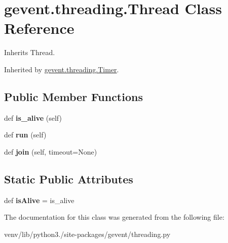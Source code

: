 \hypertarget{classgevent_1_1threading_1_1_thread}{}\section{gevent.\+threading.\+Thread Class Reference}
\label{classgevent_1_1threading_1_1_thread}


Inherits Thread.



Inherited by \hyperlink{classgevent_1_1threading_1_1_timer}{gevent.\+threading.\+Timer}.

\subsection*{Public Member Functions}
\begin{DoxyCompactItemize}
\item 
\mbox{\label{classgevent_1_1threading_1_1_thread_a26bd46955f538d4f90c461cdda2ebdbd}} 
def {\bfseries is\+\_\+alive} (self)
\item 
\mbox{\label{classgevent_1_1threading_1_1_thread_a709286335adb00b14cc74683e82641dd}} 
def {\bfseries run} (self)
\item 
\mbox{\label{classgevent_1_1threading_1_1_thread_a450df0ca7d25b7522af3237d6e155b9a}} 
def {\bfseries join} (self, timeout=None)
\end{DoxyCompactItemize}
\subsection*{Static Public Attributes}
\begin{DoxyCompactItemize}
\item 
\mbox{\label{classgevent_1_1threading_1_1_thread_a67a26e602497010c0bc03315fba9730d}} 
def {\bfseries is\+Alive} = is\+\_\+alive
\end{DoxyCompactItemize}


The documentation for this class was generated from the following file\+:\begin{DoxyCompactItemize}
\item 
venv/lib/python3./site-\/packages/gevent/threading.\+py\end{DoxyCompactItemize}
